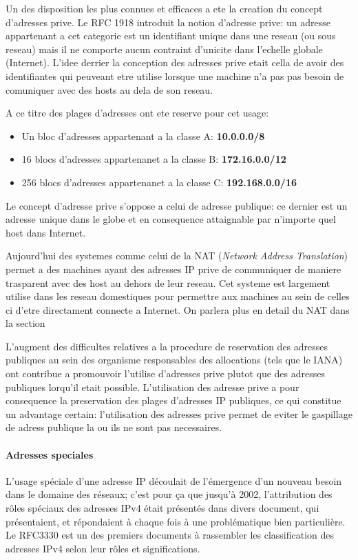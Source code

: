Un des disposition les plus connues et efficaces a ete la creation du concept
d'adresses prive. Le RFC 1918 introduit la notion d'adresse prive: un adresse
appartenant a cet categorie est un identifiant unique dans une reseau (ou sous
reseau) mais il ne comporte aucun contraint d'unicite dans l'echelle globale
(Internet). L'idee derrier la conception des adresses prive etait cella de
avoir des identifiantes qui peuveant etre utilise lorsque une machine n'a pas
pas besoin de comuniquer avec des hosts au dela de son reseau.

A ce titre des plages d'adresses ont ete reserve pour cet usage:

\begin{itemize}
\item Un bloc d'adresses appartenant a la classe A: \textbf{10.0.0.0/8}
\item 16 blocs d'adresses appartenanet a la classe B: \textbf{172.16.0.0/12}
\item 256 blocs d'adresses appartenanet a la classe C: \textbf{192.168.0.0/16}
\end{itemize}

\smallbreak
Le concept d'adresse prive s'oppose a celui de adresse publique: ce dernier est 
un adresse unique dans le globe et en consequence attaignable par n'importe
quel host dans Internet.

Aujourd'hui des systemes comme celui de la NAT ({\it Network Address
Translation}) permet a des machines ayant des adresses IP prive de communiquer
de maniere trasparent avec des host au dehors de leur reseau. Cet systeme est
largement utilise dans les reseau domestiques pour permettre aux machines au
sein de celles ci d'etre directament connecte a Internet. On parlera plus en
detail du NAT dans la section %
\smallbreak


 
L'augment des difficultes relatives a la procedure de reservation des adresses
publiques au sein des organisme responsables des allocations\cite{url-RFC-1918}
(tels que le IANA) ont contribue a promouvoir l'utilise d'adresses prive plutot
que des adresses publiques lorqu'il etait possible.
L'utilisation des adresse prive a pour consequence la preservation des plages
d'adresses IP publiques, ce qui constitue un advantage certain: l'utilisation
des adresses prive permet de eviter le gaspillage de adress publique la ou ils
ne sont pas necessaires.


\paragraph{Adresses speciales}
L'usage spéciale d'une adresse IP découlait de l'émergence
d'un nouveau besoin dans le domaine des réseaux; c'est pour
ça que jusqu'à 2002, l'attribution des rôles spéciaux des adresses
IPv4 était présentés dans divers document, qui présentaient, et répondaient à chaque fois à une
problématique bien particulière. Le RFC3330 est un des premiers documents à
rassembler les classification des adresses IPv4 selon leur rôles et significations.

